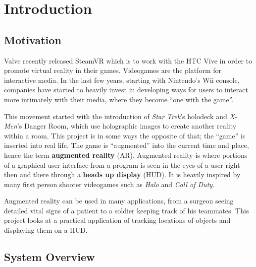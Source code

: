 
\chapter{Introduction} %

\label{Introduction} %


\section{Motivation}

Valve recently released SteamVR which is to work with the HTC Vive in order to promote virtual reality in their games. Videogames are the platform for interactive media. In the last few years, starting with Nintendo’s Wii console, companies have started to heavily invest in developing ways for users to interact more intimately with their media, where they become ``one with the game”.

This movement started with the introduction of \emph{Star Trek}’s holodeck and \emph{X-Men}’s Danger Room, which use holographic images to create another reality within a room. This project is in some ways the opposite of that; the ``game'' is inserted into real life. The game is “augmented” into the current time and place, hence the term \textbf{augmented reality} (AR). Augmented reality is where portions of a graphical user interface from a program is seen in the eyes of a user right then and there through a \textbf{heads up display} (HUD). It is heavily inspired by many first person shooter videogames such as \emph{Halo} and \emph{Call of Duty}. 

Augmented reality can be used in many applications, from a surgeon seeing detailed vital signs of a patient to a soldier keeping track of his teammates. This project looks at a practical application of tracking locations of objects and displaying them on a HUD.

\section{System Overview}

